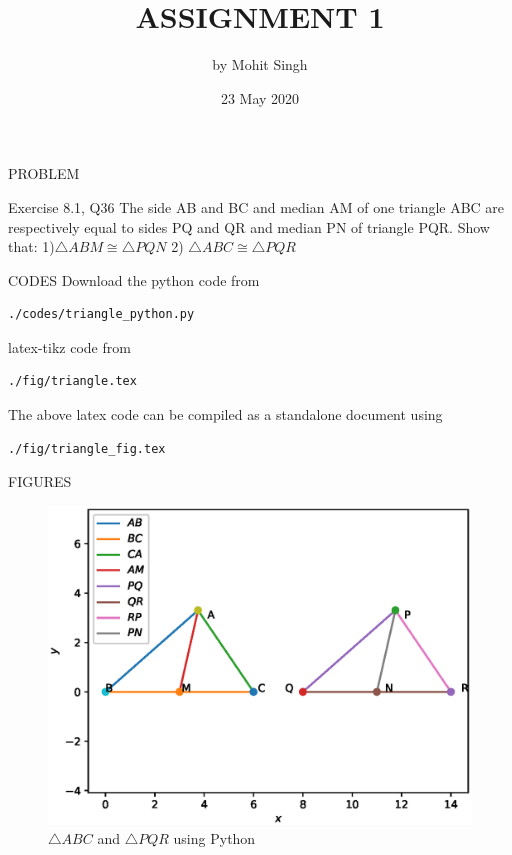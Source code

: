 \documentclass[11pt]{beamer}
\title{ASSIGNMENT 1}
\author{by Mohit Singh}
\institute{IIEST, Shibpur}
\date{23 May 2020}
\begin{document}
\maketitle
\begin{frame}{PROBLEM}
\begin{block}{Exercise 8.1, Q36}
The side AB and BC and median AM of one triangle ABC are respectively equal to sides PQ and QR and median PN of triangle PQR. Show that:
\newline
\newline
{1)$\triangle  ABM  \cong   \triangle  PQN $}
\newline
{2) $\triangle  ABC  \cong   \triangle  PQR $}
\end{block}

\end{frame}

\begin{frame}[containsverbatim]{CODES}
Download the python code from
\begin{lstlisting}
./codes/triangle_python.py
\end{lstlisting}
latex-tikz code from
\begin{lstlisting}
./fig/triangle.tex
\end{lstlisting}
The above latex code can be compiled as a standalone document using
\begin{lstlisting}
./fig/triangle_fig.tex
\end{lstlisting} 
\end{frame}

\begin{frame}{FIGURES}
\begin{figure}
\includegraphics[scale=0.5]{Figure_1.eps}
\caption{$\triangle ABC$ and $\triangle PQR$ using Python}
\end{figure}
\end{frame}
\end{document}
